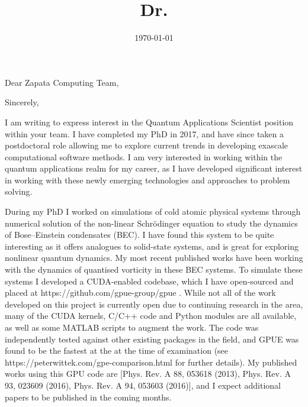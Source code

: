 \documentclass[11pt,letter,unicode]{moderncv}
\title{Dr.}
\begin{document}
    \recipient{}{}
    \date{\today} %
    \opening{Dear Zapata Computing Team,}
    \closing{Sincerely,}
    \makelettertitle
{
    \vspace{-0.5cm}
    I am writing to express interest in the Quantum Applications Scientist position within your team. I have completed my PhD in 2017, and have since taken a postdoctoral role allowing me to explore current trends in developing exascale computational software methods. I am very interested in working within the quantum applications realm for my career, as I have developed significant interest in working with these newly emerging technologies and approaches to problem solving.

During my PhD I worked on simulations of cold atomic physical systems through numerical solution of the non-linear Schr\"odinger equation to study the dynamics of Bose--Einstein condensates (BEC). I have found this system to be quite interesting as it offers analogues to solid-state systems, and is great for exploring nonlinear quantum dynamics. My most recent published works have been working with the dynamics of quantised vorticity in these BEC systems. To simulate these systems I developed a CUDA-enabled codebase, which I have open-sourced and placed at https://github.com/gpue-group/gpue . While not all of the work developed on this project is currently open due to continuing research in the area, many of the CUDA kernels, C/C++ code and Python modules are all available, as well as some MATLAB scripts to augment the work. The code was independently tested against other existing packages in the field, and GPUE was found to be the fastest at the at the time of examination (see https://peterwittek.com/gpe-comparison.html for further details). My published works using this GPU code are [Phys. Rev. A 88, 053618 (2013), Phys. Rev. A 93, 023609 (2016), Phys. Rev. A 94, 053603 (2016)], and I expect additional papers to be published in the coming months.

}
\end{document}
